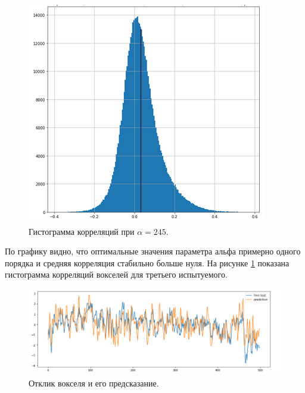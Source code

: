 \documentclass[pdftex,ptm,12pt,a4paper]{report}
\theoremstyle{definition}
\begin{document}
\begin{figure}[h]
\includegraphics[scale=0.6]{graphics/sub3_prep2.png}
\centering
\caption{Гистограмма корреляций при $\alpha=245$.}
\label{sub3_hist}
\end{figure}

По графику видно, что оптимальные значения параметра альфа примерно одного порядка и средняя корреляция стабильно больше нуля. На рисунке \ref{sub3_hist} показана гистограмма корреляций вокселей для третьего испытуемого.

\begin{figure}[h]
\includegraphics[scale=0.5]{graphics/sub3_prep2_bestvoxel.png}
\centering
\caption{Отклик вокселя и его предсказание.}
\label{sub3_bv}
\end{figure}
\end{document}
